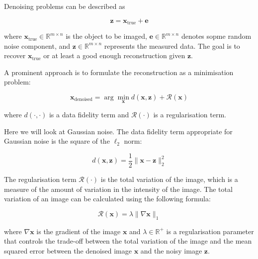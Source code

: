 \documentclass[12pt]{article}
\begin{document}

Denoising problems can be described as 

\begin{equation}
  \mathbf{z} = \mathbf{x}_{\text{true}} + \mathbf{e}
\end{equation}
  
where $\mathbf{x}_{\text{true}} \in \mathbb{R}^{m \times n}$ is 
the object to be imaged, 
$\mathbf{e} \in \mathbb{R}^{m \times n}$ denotes sopme random noise component, and $\mathbf{z} \in \mathbb{R}^{m \times n}$ represents 
the measured data.
The goal is to recover $\mathbf{x}_{\text{true}}$ or at least a good enough reconstruction given $\mathbf{z}$.

A prominent approach is to formulate the reconstruction as a minimisation problem:


\begin{equation}
  \mathbf{x}_{\text{denoised}} = \arg \min_{\mathbf{x}} d(\mathbf{x}, \mathbf{z}) + \mathcal{R}(\mathbf{x})
\end{equation}

where $d(\cdot, \cdot)$ is a data fidelity term and $\mathcal{R}(\cdot)$ is a regularisation term.


Here we will look at Gaussian noise. The data fidelity term appropriate for Gaussian noise is the square of the $\ell_2$ norm:

\begin{equation}
  d(\mathbf{x}, \mathbf{z}) = \frac{1}{2} \|\mathbf{x} - \mathbf{z}\|_2^2
\end{equation}

The regularisation term $\mathcal{R}(\cdot)$ is the total variation of the image, which is a measure of the amount of variation in the intensity of the image. The total variation of an image can be calculated using the following formula:

\begin{equation}
  \mathcal{R}(\mathbf{x}) = \lambda \| \nabla \mathbf{x} \|_1
\end{equation}

where $\nabla \mathbf{x}$ is the gradient of the image $\mathbf{x}$ and $\lambda \in \mathbb{R}^{+}$ is a regularisation parameter that controls the trade-off between the total variation of the image and the mean squared error between the denoised image $\mathbf{x}$ and the noisy image $\mathbf{z}$.
\end{document}
